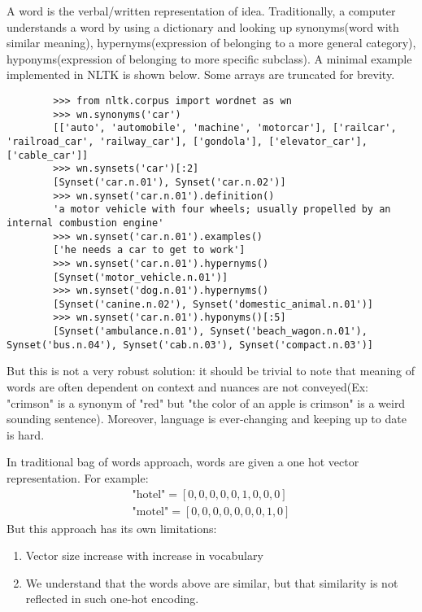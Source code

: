     A word is the verbal/written representation of idea. Traditionally, a computer understands a word by using a dictionary and looking up synonyms(word with similar meaning), hypernyms(expression of belonging to a more general category), hyponyms(expression of belonging to more specific subclass). A minimal example implemented in NLTK is shown below. Some arrays are truncated for brevity.
    \begin{lstlisting}
        >>> from nltk.corpus import wordnet as wn
        >>> wn.synonyms('car')
        [['auto', 'automobile', 'machine', 'motorcar'], ['railcar', 'railroad_car', 'railway_car'], ['gondola'], ['elevator_car'], ['cable_car']]
        >>> wn.synsets('car')[:2]
        [Synset('car.n.01'), Synset('car.n.02')]
        >>> wn.synset('car.n.01').definition()
        'a motor vehicle with four wheels; usually propelled by an internal combustion engine'
        >>> wn.synset('car.n.01').examples()
        ['he needs a car to get to work']
        >>> wn.synset('car.n.01').hypernyms()
        [Synset('motor_vehicle.n.01')]
        >>> wn.synset('dog.n.01').hypernyms()    
        [Synset('canine.n.02'), Synset('domestic_animal.n.01')]
        >>> wn.synset('car.n.01').hyponyms()[:5]
        [Synset('ambulance.n.01'), Synset('beach_wagon.n.01'), Synset('bus.n.04'), Synset('cab.n.03'), Synset('compact.n.03')]
    \end{lstlisting}
    But this is not a very robust solution: it should be trivial to note that meaning of words are often dependent on context and nuances are not conveyed(Ex: "crimson" is a synonym of "red" but "the color of an apple is crimson" is a weird sounding sentence).  Moreover, language is ever-changing and keeping up to date is hard. 
    \begin{marginfigure}%
        
    \end{marginfigure}%
    In traditional bag of words approach, words are given a one hot vector representation. For example:
    \begin{align*}
        \text{"hotel"}=[0,0,0,0,0,1,0,0,0]\\
        \text{"motel"}=[0,0,0,0,0,0,0,1,0]
    \end{align*}
    But this approach has its own limitations:
    \begin{enumerate}
        \item Vector size increase with increase in vocabulary
        \item We understand that the words above are similar, but that similarity is not reflected in such one-hot encoding.
    \end{enumerate}

